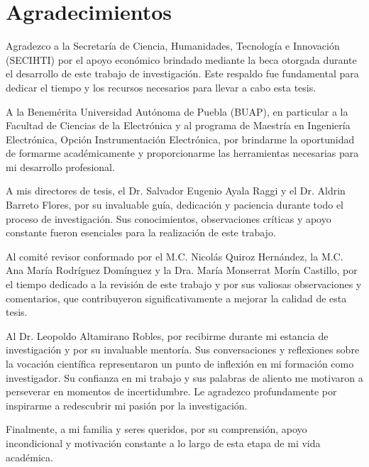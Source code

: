 \section*{Agradecimientos}

Agradezco a la Secretaría de Ciencia, Humanidades, Tecnología e Innovación (SECIHTI) por el apoyo económico brindado mediante la beca otorgada durante el desarrollo de este trabajo de investigación. Este respaldo fue fundamental para dedicar el tiempo y los recursos necesarios para llevar a cabo esta tesis.

A la Benemérita Universidad Autónoma de Puebla (BUAP), en particular a la Facultad de Ciencias de la Electrónica y al programa de Maestría en Ingeniería Electrónica, Opción Instrumentación Electrónica,  por brindarme la oportunidad de formarme académicamente y proporcionarme las herramientas necesarias para mi desarrollo profesional.

A mis directores de tesis, el Dr. Salvador Eugenio Ayala Raggi y el Dr. Aldrin Barreto Flores, por su invaluable guía, dedicación y paciencia durante todo el proceso de investigación. Sus conocimientos, observaciones críticas y apoyo constante fueron esenciales para la realización de este trabajo.

Al comité revisor conformado por el M.C. Nicolás Quiroz Hernández, la M.C. Ana María Rodríguez Domínguez y la Dra. María Monserrat Morín Castillo, por el tiempo dedicado a la revisión de este trabajo y por sus valiosas observaciones y comentarios, que contribuyeron significativamente a mejorar la calidad de esta tesis.

Al Dr. Leopoldo Altamirano Robles, por recibirme durante mi estancia de investigación y por su invaluable mentoría. Sus conversaciones y reflexiones sobre la vocación científica representaron un punto de inflexión en mi formación como investigador. Su confianza en mi trabajo y sus palabras de aliento me motivaron a perseverar en momentos de incertidumbre. Le agradezco profundamente por inspirarme a redescubrir mi pasión por la investigación.

Finalmente, a mi familia y seres queridos, por su comprensión, apoyo incondicional y motivación constante a lo largo de esta etapa de mi vida académica.
